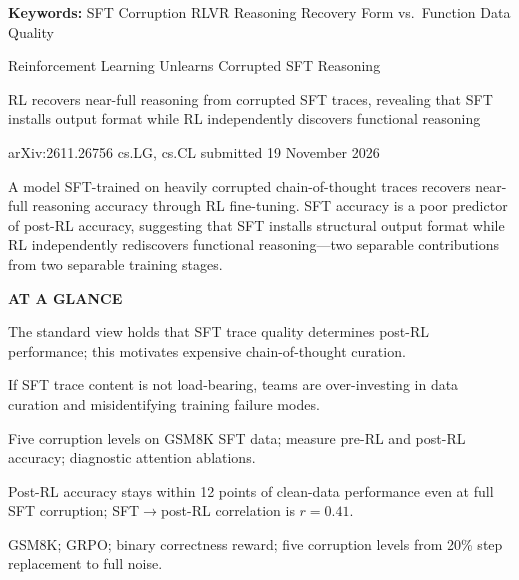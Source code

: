 \documentclass[10pt,twocolumn]{article}
\begin{document}
\setlength{\parindent}{0pt}
\setlength{\parskip}{4pt}

{\small\color{keywordgray}\textbf{Keywords:}
  SFT Corruption \textbullet{} RLVR \textbullet{} Reasoning Recovery \textbullet{} Form vs.\ Function \textbullet{} Data Quality}\par\vspace{4pt}

{\LARGE\bfseries\raggedright Reinforcement Learning Unlearns Corrupted SFT Reasoning}\par\vspace{4pt}
{\large\itshape\raggedright RL recovers near-full reasoning from corrupted SFT traces, revealing that SFT installs output format while RL independently discovers functional reasoning}\par\vspace{6pt}
{\small\color{keywordgray}arXiv:2611.26756 \textbullet{} cs.LG, cs.CL \textbullet{} submitted 19 November 2026}
\par\vspace{2pt}\noindent{\color{rulered}\rule{\columnwidth}{0.6pt}}\vspace{6pt}

A model SFT-trained on heavily corrupted chain-of-thought traces recovers near-full reasoning accuracy through RL fine-tuning.
SFT accuracy is a poor predictor of post-RL accuracy, suggesting that SFT installs structural output format while RL independently rediscovers functional reasoning---two separable contributions from two separable training stages.

\begin{mdframed}[backgroundcolor=boxgray,linecolor=rulered,linewidth=1pt,
    innerleftmargin=6pt,innerrightmargin=6pt,
    innertopmargin=6pt,innerbottommargin=6pt]
\textbf{\small AT A GLANCE}\par\vspace{4pt}
\begin{description}[leftmargin=0pt,labelsep=4pt,itemsep=2pt,parsep=0pt,
    font=\small\bfseries]
  \item[Problem:] The standard view holds that SFT trace quality determines post-RL performance; this motivates expensive chain-of-thought curation.
  \item[Why it matters:] If SFT trace content is not load-bearing, teams are over-investing in data curation and misidentifying training failure modes.
  \item[Method:] Five corruption levels on GSM8K SFT data; measure pre-RL and post-RL accuracy; diagnostic attention ablations.
  \item[Result:] Post-RL accuracy stays within 12 points of clean-data performance even at full SFT corruption; SFT$\to$post-RL correlation is $r = 0.41$.
  \item[Evidence:] GSM8K; GRPO; binary correctness reward; five corruption levels from 20\% step replacement to full noise.
\end{description}
\end{mdframed}
\end{document}
